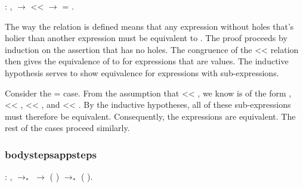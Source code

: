 \documentclass[12pt]{report}
\begin{document}
\begin{coqdoccode}
\coqdocemptyline
\coqdocindent{1.00em}
  : \coqdockw{\ensuremath{\forall}}  ,\coqdoceol
\coqdocindent{2.00em}
  \ensuremath{\rightarrow}\coqdoceol
\coqdocindent{2.00em}
 <<  \ensuremath{\rightarrow}\coqdoceol
\coqdocindent{2.00em}
 = .\coqdoceol
\coqdocemptyline
\end{coqdoccode}

The way the  relation is defined means that any
expression without holes  that's holier than another
expression  must be equivalent to .  The
proof proceeds by induction on the assertion that  has
no holes. The congruence of the << relation then gives the
equivalence of  to  for expressions that
are values.  The inductive hypothesis serves to show equivalence for
expressions with sub-expressions. 

Consider the  =  
  case. From the
assumption that   
 << , we know  is of the
form   
,  << ,
 << , and  <<
. By the inductive hypotheses, all of these
sub-expressions must therefore be equivalent. Consequently, the
 expressions are equivalent. The rest of the cases
proceed similarly. 

\subsubsection{bodystepsappsteps}

\begin{coqdoccode}
\coqdocemptyline
\coqdocindent{1.00em}
  : \coqdockw{\ensuremath{\forall}}   ,\coqdoceol
\coqdocindent{2.00em}
 $\to_*$  \ensuremath{\rightarrow}\coqdoceol
\coqdocindent{2.00em}
(  ) $\to_*$ (  ).\coqdoceol
\coqdocemptyline
\end{coqdoccode}
\end{document}
